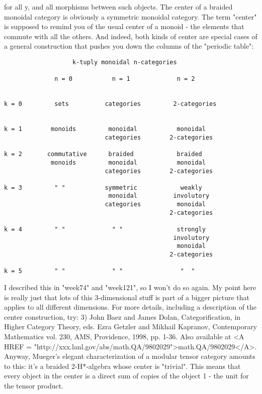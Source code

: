 for all y, and all morphisms between such objects.  The center 
of a braided monoidal category is obviously a symmetric monoidal 
category.  The term "center" is supposed to remind you of the 
usual center of a monoid - the elements that commute with all 
the others.  And indeed, both kinds of center are special cases 
of a general construction that pushes you down the columns of 
the "periodic table":
\begin{verbatim}
                   k-tuply monoidal n-categories

              n = 0           n = 1             n = 2


k = 0         sets          categories         2-categories
     

k = 1        monoids         monoidal           monoidal
                            categories        2-categories

k = 2       commutative      braided            braided
             monoids         monoidal           monoidal
                            categories        2-categories 

k = 3         " "           symmetric            weakly
                             monoidal          involutory
                            categories          monoidal
                                              2-categories

k = 4         " "             " "               strongly 
                                               involutory
                                                monoidal
                                              2-categories

k = 5         " "             " "                "  "
\end{verbatim}
    
I described this in "week74" and "week121", so I won't do so 
again.  My point here is really just that lots of this 
3-dimensional stuff is part of a bigger picture that applies 
to all different dimensions.  For more details, including a
description of the center construction, try:
3) John Baez and James Dolan, Categorification, in Higher
Category Theory, eds. Ezra Getzler and Mikhail Kapranov, 
Contemporary Mathematics vol. 230, AMS, Providence, 1998,
pp. 1-36.  Also available at <A HREF = "http://xxx.lanl.gov/abs/math.QA/9802029">math.QA/9802029</A>.
Anyway, Mueger's elegant characterization of a modular tensor
category amounts to this: it's a braided 2-H*-algebra whose 
center is "trivial".  This means that every object in the center
is a direct sum of copies of the object 1 - the unit for the
tensor product.  

